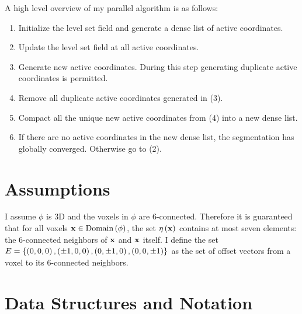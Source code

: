 \begin{samepage}
A high level overview of my parallel algorithm is as follows:

\begin{enumerate}

    \item Initialize the level set field and generate a dense list of active coordinates.

    \item Update the level set field at all active coordinates.

    \item Generate new active coordinates. During this step generating duplicate active coordinates is permitted.

    \item Remove all duplicate active coordinates generated in (3).

    \item Compact all the unique new active coordinates from (4) into a new dense list.

    \item If there are no active coordinates in the new dense list, the segmentation has globally converged. Otherwise go to (2).

\end{enumerate}
\end{samepage}

\section{Assumptions}
\label{subsec:assumptions}

I assume $ \phi $ is 3D and the voxels in $ \phi $ are 6-connected. Therefore it is guaranteed that for all voxels $ {\mathbf x} \in \mbox{Domain} \left( \phi \right) $, the set $ \eta \left( {\mathbf x} \right) $ contains at most seven elements: the 6-connected neighbors of $ {\mathbf x} $ and $ {\mathbf x} $ itself. I define the set $ E = \left\{ \left( 0,0,0 \right) , \left( \pm 1,0,0 \right) , \left( 0,\pm 1,0 \right) , \left( 0,0,\pm 1 \right) \right\} $ as the set of offset vectors from a voxel to its 6-connected neighbors.

\section{Data Structures and Notation}
\label{subsec:dataStructuresAndNotation}

